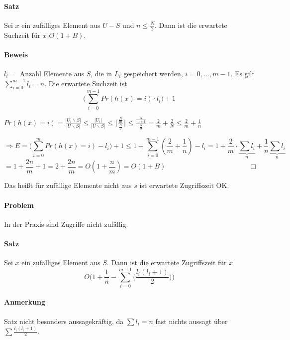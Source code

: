 \paragraph*{Satz} Sei $x$ ein zufälliges Element aus $U-S$ und $n \leq \frac{N}{2}$. Dann ist die erwartete Suchzeit für $x$ $O(1+B)$.

\paragraph*{Beweis} $l_i =$ Anzahl Elemente aus $S$, die in $L_i$ gespeichert werden, $i=0,\dots,m-1$. Es gilt $\sum\limits_{i=0}^{m-1} l_i = n$. Die erwartete Suchzeit ist $$\bigg(\sum\limits_{i=0}^{m-1} Pr(h(x)=i) \cdot l_i\bigg)+1$$

\par\medskip
$Pr(h(x)=i) = \frac{|U_i \backslash S|}{|U \backslash S|} \leq \frac{|U_i|}{|U \backslash S|} \leq\lceil \frac{\frac{N}{m}}{\frac{N}{2}} \rceil \leq \frac{\frac{N}{m+1}}{\frac{N}{2}} = \frac{2}{m} + \frac{2}{N} \leq \frac{2}{m} + \frac{1}{n}$\par\medskip

$$\Rightarrow E = \big( \sum\limits_{i=0}^m Pr(h(x)=i) - l_i \big) + 1 \leq 1+ \sum\limits_{i=0}^{m-1}(\frac{2}{m}+\frac{1}{n}) - l_i = 1+\frac{2}{m} \cdot \underbrace{\sum l_i}_{n} + \frac{1}{n} \underbrace{\sum l_i}_{n}$$ %
$$= 1+\frac{2n}{m}+1 = 2+\frac{2n}{m} = O(1+\frac{n}{m}) = O(1+B) \hspace{5cm} \Box$$

\par\medskip
Das heißt für zufällige Elemente nicht aus $s$ ist erwartete Zugriffszeit OK.\par\medskip

\paragraph*{Problem} In der Praxis sind Zugriffe nicht zufällig.

\paragraph*{Satz} Sei $x$ ein zufälliges Element aus $S$. Dann ist die erwartete Zugriffszeit für $x$ $$ O\Bigg(1+\frac{1}{n} - \sum\limits_{i=0}^{m-1}\Big( \frac{l_i(l_i+1)}{2} \Big)\Bigg) $$

\paragraph*{Anmerkung} Satz nicht besonders aussagekräftig, da $\sum l_i = n$ fast nichts aussagt über $\sum \frac{l_i(l_i+1)}{2}$.

